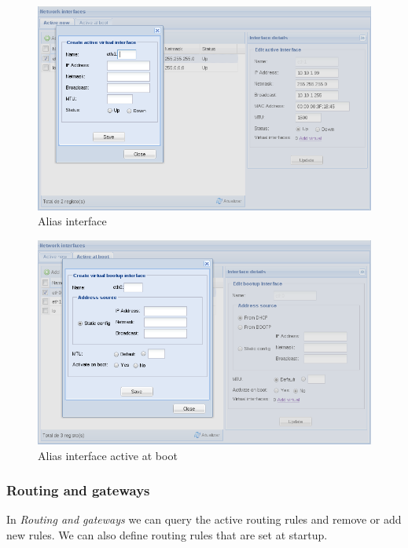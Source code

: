 \begin{figure}[H]
    \begin{center}
    \includegraphics[scale=0.38]{screenshots/etfw/etfw_network_interfaces_03.png}
    \caption{Alias interface}
    \label{fig:etfw_network_interfaces_02}
    \end{center}
\end{figure}

\begin{figure}[H]
    \begin{center}
    \includegraphics[scale=0.38]{screenshots/etfw/etfw_network_interfaces_04.png}
    \caption{Alias interface active at boot}
    \label{fig:etfw_network_interfaces_02}
    \end{center}
\end{figure}

\subsubsection{Routing and gateways}
In \textit{Routing and gateways} we can query the active routing rules and remove or add new rules.
We can also define routing rules that are set at startup.

